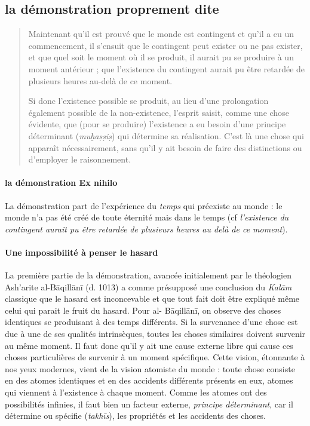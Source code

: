 \subsection{la démonstration proprement dite}

\begin{quote}
    Maintenant qu'il est prouvé que le monde est contingent et qu'il a eu un
commencement, il s'ensuit que le contingent peut exister ou ne pas
exister, et que quel soit le moment où il se produit, il aurait pu se
produire à un moment antérieur ; que l'existence du contingent aurait pu
être retardée de plusieurs heures au-delà de ce moment.

Si donc l'existence possible se produit, au lieu d'une prolongation
également possible de la non-existence, l'esprit saisit, comme une chose
évidente, que (pour se produire) l'existence a eu besoin d'une principe
déterminant (\emph{muḫaṣṣiṣ}) qui détermine sa réalisation. C'est là une
chose qui apparaît nécessairement, sans qu'il y ait besoin de faire des
distinctions ou d'employer le raisonnement.
\end{quote}

\paragraph{la démonstration Ex nihilo} La démonstration part de l'expérience du \textit{temps} qui préexiste au monde : le monde n'a pas été créé de toute éternité mais dans le temps (cf \textit{l'existence du contingent aurait pu être retardée de plusieurs heures au delà de ce moment}). 

\paragraph{Une impossibilité à penser le hasard} La première partie de la démonstration, avancée initialement par le théologien Ash'arite al-Bāqillānī (d. 1013) a comme présupposé une conclusion du \emph{Kalām} classique que le hasard est inconcevable et que tout fait doit être expliqué même celui qui parait le fruit du hasard. Pour al- Bāqillānī,  on observe des choses identiques se produisant à des temps différents. Si la survenance d'une chose est due à une de ses qualités intrinsèques, toutes les choses similaires doivent survenir au même moment. Il faut donc qu'il y ait une cause externe libre qui cause ces choses particulières de survenir à un moment spécifique. \cite[p.209]{Cambridge:ClassicalIslamicTheology} Cette vision, étonnante à nos yeux modernes, vient de la vision atomiste du monde : toute chose consiste en des atomes identiques et en des accidents différents présents en eux, atomes qui viennent à l'existence à chaque moment. Comme les atomes ont des possibilités infinies, il faut bien un facteur externe, \textit{principe déterminant}, car il détermine ou spécifie (\emph{takhīs}), les propriétés et les accidents des choses.

